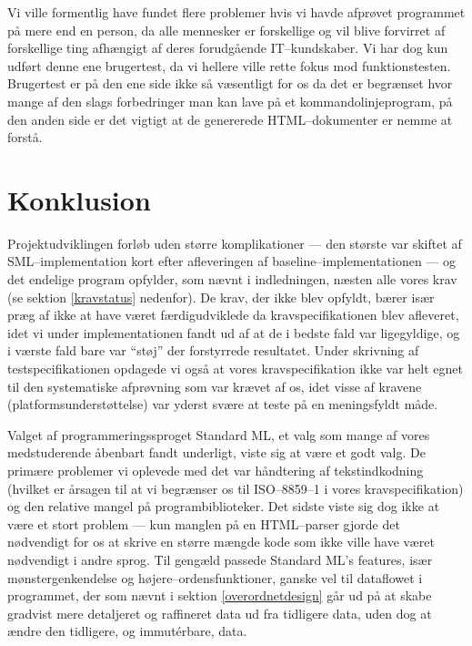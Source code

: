 \documentclass[a4paper,oneside]{memoir}
\begin{document}
Vi ville formentlig have fundet flere problemer hvis vi havde afprøvet
programmet på mere end en person, da alle mennesker er forskellige og
vil blive forvirret af forskellige ting afhængigt af deres forudgående
IT--kundskaber. Vi har dog kun udført denne ene brugertest, da vi
hellere ville rette fokus mod funktionstesten. Brugertest er på den
ene side ikke så væsentligt for os da det er begrænset hvor mange af
den slags forbedringer man kan lave på et kommandolinjeprogram, på den
anden side er det vigtigt at de genererede HTML--dokumenter er nemme
at forstå.

\chapter{Konklusion}
\label{konklusion}

Projektudviklingen forløb uden større komplikationer --- den største
var skiftet af SML--im\-ple\-men\-ta\-tion kort efter afleveringen af
baseline--implementationen --- og det endelige program opfylder, som
nævnt i indledningen, næsten alle vores krav (se sektion
\ref{kravstatus} nedenfor). De krav, der ikke blev opfyldt, bærer især
præg af ikke at have været færdigudviklede da kravspecifikationen blev
afleveret, idet vi under implementationen fandt ud af at de i bedste
fald var ligegyldige, og i værste fald bare var ``støj'' der
forstyrrede resultatet. Under skrivning af testspecifikationen
opdagede vi også at vores kravspecifikation ikke var helt egnet til
den systematiske afprøvning som var krævet af os, idet visse af
kravene (platformsunderstøttelse) var yderst svære at teste på en
meningsfyldt måde.

Valget af programmeringssproget Standard ML, et valg som mange af
vores medstuderende åbenbart fandt underligt, viste sig at være et
godt valg. De primære problemer vi oplevede med det var håndtering af
tekstindkodning (hvilket er årsagen til at vi begrænser os til
ISO--8859--1 i vores kravspecifikation) og den relative mangel på
programbiblioteker. Det sidste viste sig dog ikke at være et stort
problem --- kun manglen på en HTML--parser gjorde det nødvendigt for os
at skrive en større mængde kode som ikke ville have været nødvendigt i
andre sprog. Til gengæld passede Standard ML's features, især
mønstergenkendelse og højere--ordensfunktioner, ganske vel til
dataflowet i programmet, der som nævnt i sektion
\ref{overordnetdesign} går ud på at skabe gradvist mere detaljeret og
raffineret data ud fra tidligere data, uden dog at ændre den
tidligere, og immutérbare, data.
\end{document}
